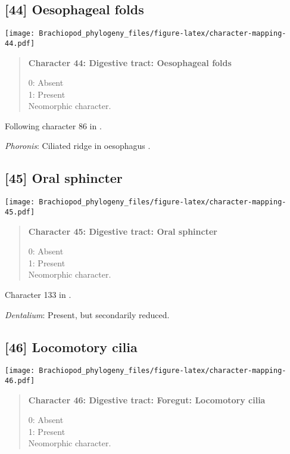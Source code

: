 \documentclass[openany]{book}
\theoremstyle{definition}
\theoremstyle{definition}
\theoremstyle{definition}
\theoremstyle{remark}
\begin{document}
\subsection*{{[}44{]} Oesophageal folds}\label{oesophageal-folds}

\texttt{[image: Brachiopod\_phylogeny\_files/figure-latex/character-mapping-44.pdf]}

\begin{quote}
\textbf{Character 44: Digestive tract: Oesophageal folds}

0: Absent\\
1: Present\\
Neomorphic character.
\end{quote}

Following character 86 in \citet{Giribet2002}.

\hypertarget{Phoronis-coding-44}{}
\emph{Phoronis}: Ciliated ridge in oesophagus \citep{Torrey1901}.

\subsection*{{[}45{]} Oral sphincter}\label{oral-sphincter}

\texttt{[image: Brachiopod\_phylogeny\_files/figure-latex/character-mapping-45.pdf]}

\begin{quote}
\textbf{Character 45: Digestive tract: Oral sphincter}

0: Absent\\
1: Present\\
Neomorphic character.
\end{quote}

Character 133 in \citet{Grobe2007}.

\hypertarget{Dentalium-coding-45}{}
\emph{Dentalium}: Present, but secondarily reduced.

\subsection*{{[}46{]} Locomotory cilia}\label{locomotory-cilia}

\texttt{[image: Brachiopod\_phylogeny\_files/figure-latex/character-mapping-46.pdf]}

\begin{quote}
\textbf{Character 46: Digestive tract: Foregut: Locomotory cilia}

0: Absent\\
1: Present\\
Neomorphic character.
\end{quote}
\end{document}
